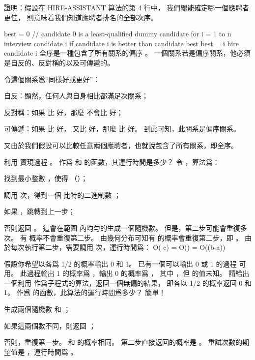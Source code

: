 \startsection[
  title={The hiring problem},
]

\startEXERCISE
證明：假設在 HIRE-ASSISTANT 算法的第 4 行中，
我們總能確定哪一個應聘者更佳，
則意味着我們知道應聘者排名的全部次序。

\startCLRS
best = 0	// candidate 0 is a least-qualified dummy candidate
for i = 1 to n
	interview candidate i
	if candidate i is better than candidate best
		best = i
		hire candidate i
\stopCLRS
\stopEXERCISE
\startANSWER
全序是一種包含了所有關系的偏序 。
一個關系若是偏序關系，他必須是自反的、反對稱的以及可傳遞的。

令這個關系爲“同樣好或更好”：
\startigBase[1]
\item 自反：顯然，任何人與自身相比都滿足次關系；
\item 反對稱：如果  比  好，那麼  不會比  好；
\item 可傳遞：如果  比  好，  又比  好，那麼  比  好。
\stopigBase
到此可知，此關系是偏序關系。

又由於我們假設可以比較任意兩個應聘者，也就說包含了所有關系，即全序。
\stopANSWER

\startEXERCISE \DIFFICULT
利用  實現過程 。
作爲  和  的函數，其運行時間是多少？
\stopEXERCISE
\startANSWER
令 ，算法爲：
\startigBase[n]
\item 找到最小整數 ，使得  （）；
\item 調用   次，得到一個  比特的二進制數 ；
\item 如果 ，跳轉到上一步；
\item 否則返回 。
\stopigBase
這會在範圍 \m{[a, b]} 內均勻的生成一個隨機數。
但是，第二步可能會重復多次。
有  概率不會重復第二步。
由幾何分布可知有  的概率會重復第二步，即 。
由於每次執行第二步，需要調用   次，運行時間爲：
\startformula
O( c) = O() = O(\ln(b-a))
\stopformula
\stopANSWER

\startEXERCISE \DIFFICULT
假設你希望以各爲 1/2 的概率輸出 0 和 1。
已有一個可以輸出 0 或 1 的過程  可用。
此過程輸出 1 的概率爲 ，輸出 0 的概率爲 ，
其中 ，但  的值未知。
請給出一個利用  作爲子程式的算法，返回一個無偏的結果，
即各以 1/2 的概率返回 0 和 1。
作爲  的函數，此算法的運行時間爲多少？
\stopEXERCISE
\startANSWER
簡單！
\startigBase[n]
\item 生成兩個隨機數  和 ；
\item 如果這兩個數不同，則返回 ；
\item 否則，重復第一步。
\stopigBase
{} 和  的概率相同。
第二步直接返回的概率是 。
重試次數的期望值是 ，運行時間爲 。
\stopANSWER

\stopsection
